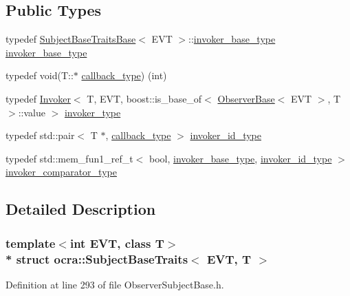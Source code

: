 \subsection*{Public Types}
\begin{DoxyCompactItemize}
\item 
typedef \hyperlink{structocra_1_1SubjectBaseTraitsBase}{Subject\+Base\+Traits\+Base}$<$ E\+VT $>$\+::\hyperlink{structocra_1_1SubjectBaseTraitsBase_a439671662c8f8f3e80e6675f008dec3f}{invoker\+\_\+base\+\_\+type} \hyperlink{structocra_1_1SubjectBaseTraits_a067ad14df588b765cd8941e21348c954}{invoker\+\_\+base\+\_\+type}
\item 
typedef void(T\+::$\ast$ \hyperlink{structocra_1_1SubjectBaseTraits_ab8c572ba6805d72ddf4137da6e2f4480}{callback\+\_\+type}) (int)
\item 
typedef \hyperlink{classocra_1_1Invoker}{Invoker}$<$ T, E\+VT, boost\+::is\+\_\+base\+\_\+of$<$ \hyperlink{classocra_1_1ObserverBase}{Observer\+Base}$<$ E\+VT $>$, T $>$\+::value $>$ \hyperlink{structocra_1_1SubjectBaseTraits_a7d6f024ca6d59f607025916cbb7a3423}{invoker\+\_\+type}
\item 
typedef std\+::pair$<$ T $\ast$, \hyperlink{structocra_1_1SubjectBaseTraits_ab8c572ba6805d72ddf4137da6e2f4480}{callback\+\_\+type} $>$ \hyperlink{structocra_1_1SubjectBaseTraits_a2c4f3af9b3e93bf96232c36df6f43986}{invoker\+\_\+id\+\_\+type}
\item 
typedef std\+::mem\+\_\+fun1\+\_\+ref\+\_\+t$<$ bool, \hyperlink{structocra_1_1SubjectBaseTraitsBase_a439671662c8f8f3e80e6675f008dec3f}{invoker\+\_\+base\+\_\+type}, \hyperlink{structocra_1_1SubjectBaseTraits_a2c4f3af9b3e93bf96232c36df6f43986}{invoker\+\_\+id\+\_\+type} $>$ \hyperlink{structocra_1_1SubjectBaseTraits_a791cf85201dfcbdc6213946c36d698ca}{invoker\+\_\+comparator\+\_\+type}
\end{DoxyCompactItemize}


\subsection{Detailed Description}
\subsubsection*{template$<$int E\+VT, class T$>$\\*
struct ocra\+::\+Subject\+Base\+Traits$<$ E\+V\+T, T $>$}



Definition at line 293 of file Observer\+Subject\+Base.\+h.




